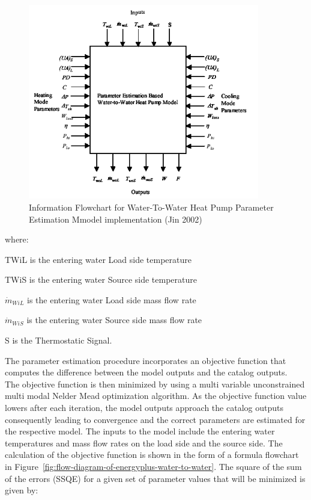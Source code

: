 \begin{figure}[hbtp] %
\centering
\includegraphics[width=0.9\textwidth, height=0.9\textheight, keepaspectratio=true]{media/image5306.png}
\caption{Information Flowchart for Water-To-Water Heat Pump Parameter Estimation Mmodel implementation (Jin 2002) \protect \label{fig:information-flowchart-for-water-to-water-heat}}
\end{figure}

where:

TWiL is the entering water Load side temperature

TWiS is the entering water Source side temperature

\({\dot{m}_{WiL}}\) is the entering water Load side mass flow rate

\({\dot{m}_{WiS}}\) is the entering water Source side mass flow rate

S is the Thermostatic Signal.

The parameter estimation procedure incorporates an objective function that computes the difference between the model outputs and the catalog outputs.~ The objective function is then minimized by using a multi variable unconstrained multi modal Nelder Mead optimization algorithm. As the objective function value lowers after each iteration, the model outputs approach the catalog outputs consequently leading to convergence and the correct parameters are estimated for the respective model. The inputs to the model include the entering water temperatures and mass flow rates on the load side and the source side. The calculation of the objective function is shown in the form of a formula flowchart in Figure~\ref{fig:flow-diagram-of-energyplus-water-to-water}. The square of the sum of the errors (SSQE) for a given set of parameter values that will be minimized is given by:

